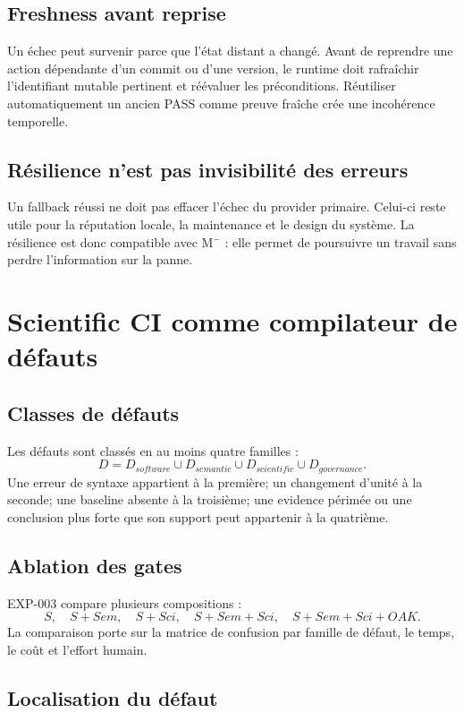 \section{Freshness avant reprise}

Un échec peut survenir parce que l'état distant a changé. Avant de reprendre une action dépendante d'un commit ou d'une version, le runtime doit rafraîchir l'identifiant mutable pertinent et réévaluer les préconditions. Réutiliser automatiquement un ancien PASS comme preuve fraîche crée une incohérence temporelle.

\section{Résilience n'est pas invisibilité des erreurs}

Un fallback réussi ne doit pas effacer l'échec du provider primaire. Celui-ci reste utile pour la réputation locale, la maintenance et le design du système. La résilience est donc compatible avec M$^-$ : elle permet de poursuivre un travail sans perdre l'information sur la panne.

\chapter{Scientific CI comme compilateur de défauts}

\section{Classes de défauts}

Les défauts sont classés en au moins quatre familles :
\[
D=D_{software}\cup D_{semantic}\cup D_{scientific}\cup D_{governance}.
\]
Une erreur de syntaxe appartient à la première; un changement d'unité à la seconde; une baseline absente à la troisième; une evidence périmée ou une conclusion plus forte que son support peut appartenir à la quatrième.

\section{Ablation des gates}

EXP-003 compare plusieurs compositions :
\[
S,\quad S+Sem,\quad S+Sci,\quad S+Sem+Sci,\quad S+Sem+Sci+OAK.
\]
La comparaison porte sur la matrice de confusion par famille de défaut, le temps, le coût et l'effort humain.

\section{Localisation du défaut}

